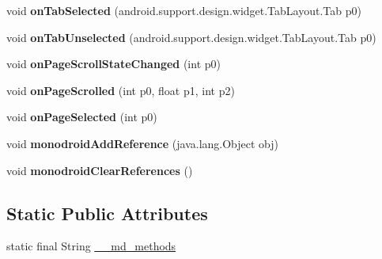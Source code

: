 \begin{DoxyCompactItemize}
\item 
\mbox{\label{classmd5270abb39e60627f0f200893b490a1ade_1_1_tabbed_page_renderer_ab3b382046f76dcb461f46c32f878ce21}} 
void {\bfseries on\+Tab\+Selected} (android.\+support.\+design.\+widget.\+Tab\+Layout.\+Tab p0)
\item 
\mbox{\label{classmd5270abb39e60627f0f200893b490a1ade_1_1_tabbed_page_renderer_a34344ed4429e52347801b12b7a69da61}} 
void {\bfseries on\+Tab\+Unselected} (android.\+support.\+design.\+widget.\+Tab\+Layout.\+Tab p0)
\item 
\mbox{\label{classmd5270abb39e60627f0f200893b490a1ade_1_1_tabbed_page_renderer_a6ee3c70ee2769ea4ce88b1c0e7accd74}} 
void {\bfseries on\+Page\+Scroll\+State\+Changed} (int p0)
\item 
\mbox{\label{classmd5270abb39e60627f0f200893b490a1ade_1_1_tabbed_page_renderer_a2be7798b85b19ace799e0aac88245757}} 
void {\bfseries on\+Page\+Scrolled} (int p0, float p1, int p2)
\item 
\mbox{\label{classmd5270abb39e60627f0f200893b490a1ade_1_1_tabbed_page_renderer_a1d0954491d422f9bedb21658957b4bfb}} 
void {\bfseries on\+Page\+Selected} (int p0)
\item 
\mbox{\label{classmd5270abb39e60627f0f200893b490a1ade_1_1_tabbed_page_renderer_ac61a8f262b7596ff2eb4e667464f9d36}} 
void {\bfseries monodroid\+Add\+Reference} (java.\+lang.\+Object obj)
\item 
\mbox{\label{classmd5270abb39e60627f0f200893b490a1ade_1_1_tabbed_page_renderer_a3b2f80dac52df3f43f79ec6bd4748239}} 
void {\bfseries monodroid\+Clear\+References} ()
\end{DoxyCompactItemize}
\subsection*{Static Public Attributes}
\begin{DoxyCompactItemize}
\item 
static final String \hyperlink{classmd5270abb39e60627f0f200893b490a1ade_1_1_tabbed_page_renderer_a61bf05aab3c9447ee5d368ab4be86a41}{\+\_\+\+\_\+md\+\_\+methods}
\end{DoxyCompactItemize}


